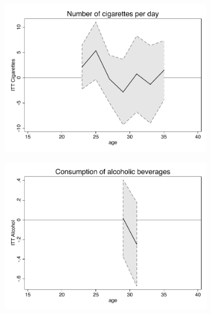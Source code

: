\documentclass[a4paper ]{article}
\begin{document}
\begin{figure}[p]
\begin{subfigure}[h]{0.48\textwidth}\centering
	\includegraphics[width=\textwidth]{../../analysis/graphs/SOEP/Cigarettes_LC.pdf}
\end{subfigure}
\quad
\begin{subfigure}[h]{0.48\textwidth}\centering
	\includegraphics[width=\textwidth]{../../analysis/graphs/SOEP/Alcohol_LC.pdf}
\end{subfigure}




\end{figure}
\end{document}
